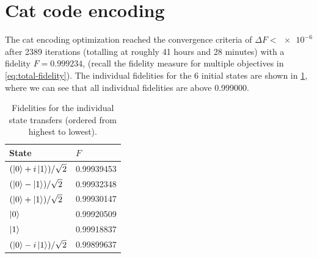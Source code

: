 \documentclass[main.tex]{subfiles}
\begin{document}
\clearpage{}
\section{Cat code encoding}
The cat encoding optimization reached the convergence criteria of \(\Delta F < \num{e-6}\) after 2389 iterations (totalling at roughly 41 hours and 28 minutes) with a fidelity \(F = 0.999234\), (recall the fidelity measure for multiple objectives in \cref{eq:total-fidelity}).
The individual fidelities for the 6 initial states are shown in \cref{tab:cat-fidelities}, where we can see that all individual fidelities are above 0.999000.

\begin{table}[H]
    \caption{Fidelities for the individual state transfers (ordered from highest to lowest).}%
    \label{tab:cat-fidelities}
    \centering
    \begin{tabular}{@{}ll@{}}
    \toprule
    State & \(F\)\\ \midrule
	\((\ket{0}+i\ket{1})/\sqrt{2}\) & 0.99939453 \\
	\((\ket{0}-\ket{1})/\sqrt{2}\) & 0.99932348 \\
	\((\ket{0}+\ket{1})/\sqrt{2}\) & 0.99930147 \\
    \(\ket{0}\) & 0.99920509 \\
	\(\ket{1}\) & 0.99918837 \\
	\((\ket{0}-i\ket{1})/\sqrt{2}\) & 0.99899637 \\
    \bottomrule
    \end{tabular}
\end{table}
\end{document}
